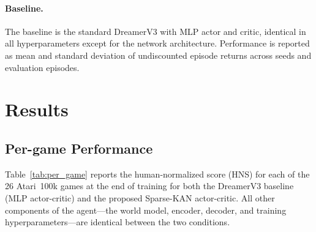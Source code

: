 \documentclass[11pt, a4paper]{article}
\begin{document}
\paragraph{Baseline.}
The baseline is the standard DreamerV3 with MLP actor and critic, identical in
all hyperparameters except for the network architecture. Performance is reported
as mean and standard deviation of undiscounted episode returns across seeds and
evaluation episodes.

\section{Results}

\subsection{Per-game Performance}

Table~\ref{tab:per_game} reports the human-normalized score (HNS) for each of the 26 Atari~100k
games at the end of training for both the DreamerV3 baseline (MLP actor-critic) and the
proposed Sparse-KAN actor-critic. All other components of the agent---the world model,
encoder, decoder, and training hyperparameters---are identical between the two conditions.
\end{document}
